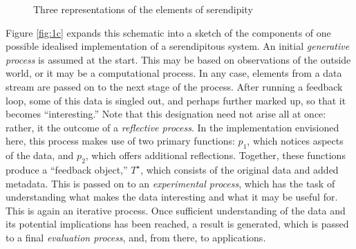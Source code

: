 \afterpage{\clearpage}
\begin{figure}[p]
\begin{minipage}[b]{\textwidth}
{\centering


\par}
\label{fig:1a}
\end{minipage}
\medskip

\begin{minipage}[b]{\textwidth}
{\centering

\par}
\label{fig:1b}
\end{minipage}
\medskip

\begin{minipage}[b]{\textwidth}
{\centering


\par}
\smallskip

\label{fig:1c}
\end{minipage}
\bigskip

\caption{Three representations of the elements of serendipity}\label{fig:model}
\end{figure}

Figure \ref{fig:1c} expands this schematic into a sketch of the
components of one possible idealised implementation of a serendipitous
system.  An initial \emph{generative process} is assumed at the start.
This may be based on observations of the outside world, or it may be a
computational process.  In any case, elements from a data stream are
passed on to the next stage of the process.  After running a feedback
loop, some of this data is singled out, and perhaps further marked up,
so that it becomes ``interesting.''  Note that this designation need
not arise all at once: rather, it the outcome of a \emph{reflective
  process}.  In the implementation envisioned here, this process makes
use of two primary functions: $p_1$, which notices aspects of the
data, and $p_2$, which offers additional reflections.  Together, these
functions produce a ``feedback object,'' $T^{\star}$, which consists
of the original data and added metadata.  This is passed on to an
\emph{experimental process}, which has the task of understanding what
makes the data interesting and what it may be useful for.  This is
again an iterative process.  Once sufficient understanding of the data
and its potential implications has been reached, a result is
generated, which is passed to a final \emph{evaluation process}, and,
from there, to applications.  

